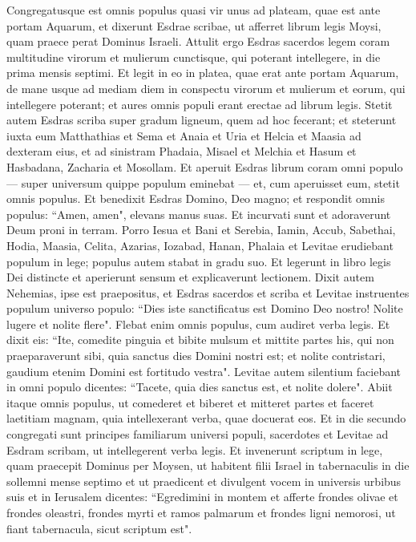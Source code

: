 \begin{biblechapter}  
\verse Congregatusque est omnis populus quasi vir unus ad plateam, quae est ante portam Aquarum, et dixerunt Esdrae scribae, ut afferret librum legis Moysi, quam praece perat Dominus Israeli. 
\verse Attulit ergo Esdras sacerdos legem coram multitudine virorum et mulierum cunctisque, qui poterant intellegere, in die prima mensis septimi. 
\verse Et legit in eo in platea, quae erat ante portam Aquarum, de mane usque ad mediam diem in conspectu virorum et mulierum et eorum, qui intellegere poterant; et aures omnis populi erant erectae ad librum legis. 
\verse Stetit autem Esdras scriba super gradum ligneum, quem ad hoc fecerant; et steterunt iuxta eum Matthathias et Sema et Anaia et Uria et Helcia et Maasia ad dexteram eius, et ad sinistram Phadaia, Misael et Melchia et Hasum et Hasbadana, Zacharia et Mosollam. 
\verse Et aperuit Esdras librum coram omni populo — super universum quippe populum eminebat — et, cum aperuisset eum, stetit omnis populus. 
\verse Et benedixit Esdras Domino, Deo magno; et respondit omnis populus: “Amen, amen", elevans manus suas. Et incurvati sunt et adoraverunt Deum proni in terram. 
\verse Porro Iesua et Bani et Serebia, Iamin, Accub, Sabethai, Hodia, Maasia, Celita, Azarias, Iozabad, Hanan, Phalaia et Levitae erudiebant populum in lege; populus autem stabat in gradu suo. 
\verse Et legerunt in libro legis Dei distincte et aperierunt sensum et explicaverunt lectionem. 
\verse Dixit autem Nehemias, ipse est praepositus, et Esdras sacerdos et scriba et Levitae instruentes populum universo populo: “Dies iste sanctificatus est Domino Deo nostro! Nolite lugere et nolite flere". Flebat enim omnis populus, cum audiret verba legis. 
\verse Et dixit eis: “Ite, comedite pinguia et bibite mulsum et mittite partes his, qui non praeparaverunt sibi, quia sanctus dies Domini nostri est; et nolite contristari, gaudium etenim Domini est fortitudo vestra". 
\verse Levitae autem silentium faciebant in omni populo dicentes: “Tacete, quia dies sanctus est, et nolite dolere". 
\verse Abiit itaque omnis populus, ut comederet et biberet et mitteret partes et faceret laetitiam magnam, quia intellexerant verba, quae docuerat eos. 
\verse Et in die secundo congregati sunt principes familiarum universi populi, sacerdotes et Levitae ad Esdram scribam, ut intellegerent verba legis. 
\verse Et invenerunt scriptum in lege, quam praecepit Dominus per Moysen, ut habitent filii Israel in tabernaculis in die sollemni mense septimo 
\verse et ut praedicent et divulgent vocem in universis urbibus suis et in Ierusalem dicentes: “Egredimini in montem et afferte frondes olivae et frondes oleastri, frondes myrti et ramos palmarum et frondes ligni nemorosi, ut fiant tabernacula, sicut scriptum est". 

\end{biblechapter}

